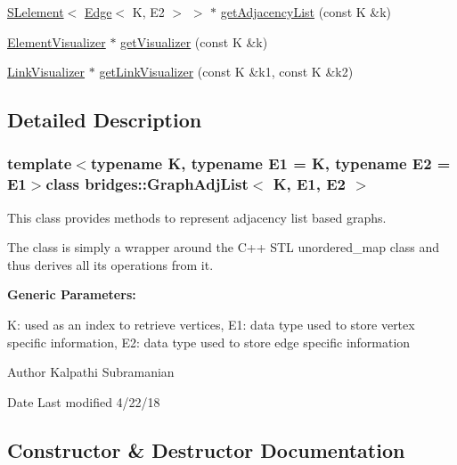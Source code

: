 \begin{DoxyCompactItemize}
\item 
\hyperlink{classbridges_1_1_s_lelement}{S\+Lelement}$<$ \hyperlink{classbridges_1_1_edge}{Edge}$<$ K, E2 $>$ $>$ $\ast$ \hyperlink{classbridges_1_1_graph_adj_list_ab9eb791b7c242742ac832121f297acdc}{get\+Adjacency\+List} (const K \&k)
\item 
\hyperlink{classbridges_1_1_element_visualizer}{Element\+Visualizer} $\ast$ \hyperlink{classbridges_1_1_graph_adj_list_a1c2c773a13dbd1fddd55bc2642c08574}{get\+Visualizer} (const K \&k)
\item 
\hyperlink{classbridges_1_1_link_visualizer}{Link\+Visualizer} $\ast$ \hyperlink{classbridges_1_1_graph_adj_list_a6e065b1411388387ff1e4df9227ce480}{get\+Link\+Visualizer} (const K \&k1, const K \&k2)
\end{DoxyCompactItemize}


\subsection{Detailed Description}
\subsubsection*{template$<$typename K, typename E1 = K, typename E2 = E1$>$class bridges\+::\+Graph\+Adj\+List$<$ K, E1, E2 $>$}

This class provides methods to represent adjacency list based graphs. 

The class is simply a wrapper around the C++ S\+T\+L unordered\+\_\+map class and thus derives all its operations from it.

{\bfseries Generic Parameters\+:} \begin{DoxyVerb}     K:  used as an index to retrieve vertices,
     E1: data type used to store vertex specific information,
     E2: data type used to store edge specific information
\end{DoxyVerb}


\begin{DoxyAuthor}{Author}
Kalpathi Subramanian 
\end{DoxyAuthor}
\begin{DoxyDate}{Date}
Last modified 4/22/18 
\end{DoxyDate}


\subsection{Constructor \& Destructor Documentation}
\hypertarget{classbridges_1_1_graph_adj_list_af7acceab0f85c75de56cf2fc74b3690b}{}
